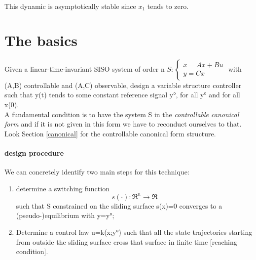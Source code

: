 This dynamic is asymptotically stable since $x_1$ tends to zero.
\section{The basics}
Given a linear-time-invariant SISO system of order n $S:\begin{cases}
	\dot{x}=Ax+Bu\\y=Cx
\end{cases}$ with (A,B) controllable and (A,C) observable, design a variable structure controller such that y(t) tends to some constant reference signal y°, for all y° and for all x(0). \\ A fundamental condition is to have the system S in the \emph{controllable canonical form} and if it is not given in this form we have to reconduct ourselves to that. Look Section \ref{canonical} for the controllable canonical form structure.
\paragraph{design procedure} We can concretely identify two main steps for this technique:	
\begin{enumerate}
	\item determine a switching function 
	\[
	s(\cdot):\Re^n\to\Re
	\]
	such that S constrained on the sliding surface s(x)=0 converges to a (pseudo-)equilibrium with y=y°;
	\item Determine a control law u=k(x;y°) such that all the state trajectories starting from outside the sliding surface cross that surface in finite time [reaching condition].
\end{enumerate}
